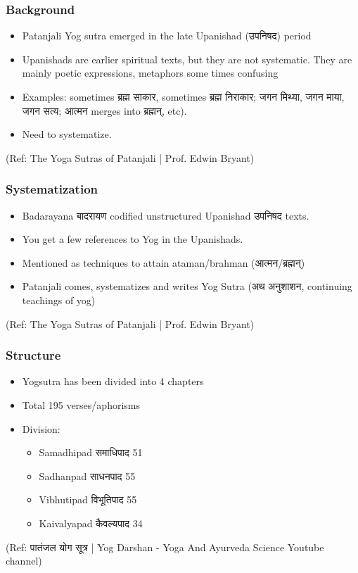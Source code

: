 \begin{frame}[fragile]\frametitle{Background}

	\begin{itemize}
	\item Patanjali Yog sutra emerged in the late Upanishad (उपनिषद) period
	\item Upanishads are earlier spiritual texts, but they are not systematic. They are mainly poetic expressions, metaphors some times confusing
	\item Examples: sometimes ब्रह्म साकार, sometimes ब्रह्म निराकार; जगन मिथ्या, जगन माया, जगन सत्य; आत्मन merges into ब्रह्मन्, etc). 
	\item Need to systematize.
	\end{itemize}

\tiny{(Ref: The Yoga Sutras of Patanjali | Prof. Edwin Bryant)}

\end{frame}

\begin{frame}[fragile]\frametitle{Systematization}

	\begin{itemize}
	\item Badarayana बादरायण codified unstructured Upanishad  उपनिषद texts.
	\item You get a few references to Yog in the Upanishads.
	\item Mentioned as techniques to attain ataman/brahman (आत्मन/ब्रह्मन्)
	\item Patanjali comes, systematizes and writes Yog Sutra (अथ अनुशाशन, continuing teachings of yog)
	\end{itemize}

\tiny{(Ref: The Yoga Sutras of Patanjali | Prof. Edwin Bryant)}

\end{frame}

\begin{frame}[fragile]\frametitle{Structure}

	\begin{itemize}
	\item Yogsutra has been divided into 4 chapters
	\item Total 195 verses/aphorisms
	\item Division:
		\begin{itemize}
		\item Samadhipad समाधिपाद 51
		\item Sadhanpad साधनपाद 55
		\item Vibhutipad विभूतिपाद 55
		\item Kaivalyapad कैवल्यपाद 34
		\end{itemize}	
	\end{itemize}

\tiny{(Ref: पातंजल योग सूत्र | Yog Darshan - Yoga And Ayurveda Science Youtube channel)}

\end{frame}


